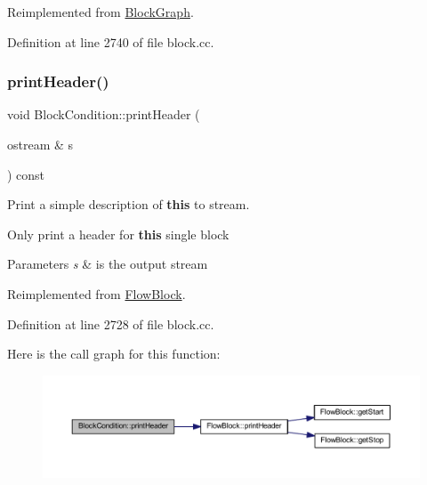 Reimplemented from \mbox{\hyperlink{class_block_graph_aba0d42cf572bdcf2bca44d22fad971f6}{Block\+Graph}}.



Definition at line 2740 of file block.\+cc.

\mbox{\label{class_block_condition_a94ff21df098dda7c4cb50c87c500c439}} 
\subsubsection{\texorpdfstring{printHeader()}{printHeader()}}
{\footnotesize\ttfamily void Block\+Condition\+::print\+Header (\begin{DoxyParamCaption}\item[{ostream \&}]{s }\end{DoxyParamCaption}) const\hspace{0.3cm}{\ttfamily [virtual]}}



Print a simple description of {\bfseries{this}} to stream. 

Only print a header for {\bfseries{this}} single block 
\begin{DoxyParams}{Parameters}
{\em s} & is the output stream \\
\hline
\end{DoxyParams}


Reimplemented from \mbox{\hyperlink{class_flow_block_a0d19c5b80186cf289dfbe0ce9e3ce37a}{Flow\+Block}}.



Definition at line 2728 of file block.\+cc.

Here is the call graph for this function\+:
\nopagebreak
\begin{figure}[H]
\begin{center}
\leavevmode
\includegraphics[width=350pt]{class_block_condition_a94ff21df098dda7c4cb50c87c500c439_cgraph}
\end{center}
\end{figure}
\mbox{\label{class_block_condition_a1e24ce75951cb7a66b281eeabe7854c0}} 
